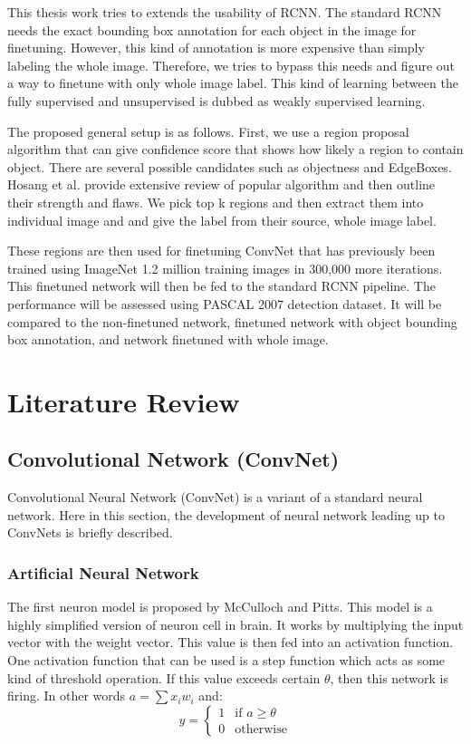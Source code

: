\documentclass[a4paper,11pt]{kth-mag}
\begin{document}
This thesis work tries to extends the usability of RCNN. The standard RCNN needs the exact bounding box annotation for each object in the image for finetuning. However, this kind of annotation is more expensive than simply labeling the whole image. Therefore, we tries to bypass this needs and figure out a way to finetune with only whole image label. This kind of learning between the fully supervised and unsupervised is dubbed as weakly supervised learning.

The proposed general setup is as follows. First, we use a region proposal algorithm that can give confidence score that shows how likely a region to contain object. There are several possible candidates such as objectness \cite{obj} and EdgeBoxes. Hosang et al. \cite{hosang2014} provide extensive review of popular algorithm and then outline their strength and flaws. We pick top k regions and then extract them into individual image and and give the label from their source, whole image label.

These regions are then used for finetuning ConvNet that has previously been trained using ImageNet 1.2 million training images in 300,000 more iterations. This finetuned network will then be fed to the standard RCNN pipeline. The performance will be assessed using PASCAL 2007 detection dataset. It will be compared to the non-finetuned network, finetuned network with object bounding box annotation, and network finetuned with whole image.


\chapter{Literature Review}
\section{Convolutional Network (ConvNet)}
Convolutional Neural Network (ConvNet) is a variant of a standard neural network. Here in this section, the development of neural network leading up to ConvNets is briefly described.

\subsection{Artificial Neural Network}
The first neuron model is proposed by McCulloch and Pitts. This model is a highly simplified version of neuron cell in brain. It works by multiplying the input vector with the weight vector. This value is then fed into an activation function. One activation function that can be used is a step function which acts as some kind of threshold operation. If this value exceeds certain $\theta$, then this network is firing. In other words $ a = \sum x_i w_i $ and:
\begin{equation}
y = 
	\begin{cases}
	1 & \text{if } a \geq \theta \\
	0 & \text{otherwise}
	\end{cases}
\end{equation}
\end{document}
